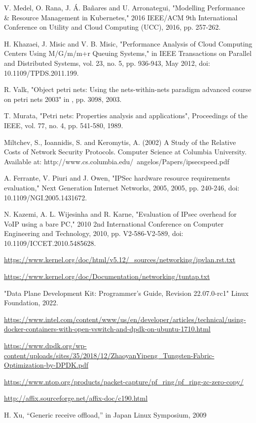 \documentclass[conference]{IEEEtran}
\begin{document}
\begin{thebibliography}{1}
V. Medel, O. Rana, J. Á. Bañares and U. Arronategui, "Modelling Performance \& Resource Management in Kubernetes," 2016 IEEE/ACM 9th International Conference on Utility and Cloud Computing (UCC), 2016, pp. 257-262.

H. Khazaei, J. Misic and V. B. Misic, "Performance Analysis of Cloud Computing Centers Using M/G/m/m+r Queuing Systems," in IEEE Transactions on Parallel and Distributed Systems, vol. 23, no. 5, pp. 936-943, May 2012, doi: 10.1109/TPDS.2011.199.

R. Valk, "Object petri nets: Using the nets-within-nets paradigm advanced course on petri nets 2003" in , pp. 3098, 2003.

T. Murata, "Petri nets: Properties analysis and applications", Proceedings of the IEEE, vol. 77, no. 4, pp. 541-580, 1989.

Miltchev, S., Ioannidis, S. and Keromytis, A. (2002) A Study of the Relative Costs of Network Security Protocols. Computer Science at Columbia University. Available at: http://www.cs.columbia.edu/~angelos/Papers/ipsecspeed.pdf

A. Ferrante, V. Piuri and J. Owen, "IPSec hardware resource requirements evaluation," Next Generation Internet Networks, 2005, 2005, pp. 240-246, doi: 10.1109/NGI.2005.1431672.

N. Kazemi, A. L. Wijesinha and R. Karne, "Evaluation of IPsec overhead for VoIP using a bare PC," 2010 2nd International Conference on Computer Engineering and Technology, 2010, pp. V2-586-V2-589, doi: 10.1109/ICCET.2010.5485628.

\url{https://www.kernel.org/doc/html/v5.12/_sources/networking/ipvlan.rst.txt}

\url{https://www.kernel.org/doc/Documentation/networking/tuntap.txt}

"Data Plane Development Kit: Programmer's Guide, Revision 22.07.0-rc1" Linux Foundation, 2022.

\url{https://www.intel.com/content/www/us/en/developer/articles/technical/using-docker-containers-with-open-vswitch-and-dpdk-on-ubuntu-1710.html}

\url{https://www.dpdk.org/wp-content/uploads/sites/35/2018/12/ZhaoyanYipeng_Tungsten-Fabric-Optimization-by-DPDK.pdf}

\url{https://www.ntop.org/products/packet-capture/pf_ring/pf_ring-zc-zero-copy/}

\url{http://affix.sourceforge.net/affix-doc/c190.html}

H. Xu, “Generic receive offload,” in Japan Linux Symposium, 2009

\end{thebibliography}

\end{document}
